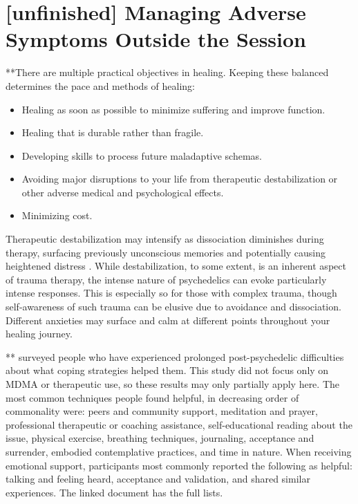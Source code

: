 \documentclass[12pt,letterpaper]{book}
\begin{document}
\section{[unfinished] Managing Adverse Symptoms Outside the Session}
\label{sectionManagement}
**There are multiple practical objectives in healing. Keeping these balanced determines the pace and methods of healing: 
\begin{itemize}
    \item Healing as soon as possible to minimize suffering and improve function.
    \item Healing that is durable rather than fragile.
    \item Developing skills to process future maladaptive schemas.
    \item Avoiding major disruptions to your life from therapeutic destabilization or other adverse medical and psychological effects.
    \item Minimizing cost.
\end{itemize}
Therapeutic destabilization may intensify as dissociation diminishes during therapy, surfacing previously unconscious memories and potentially causing heightened distress \cite{vanderKolkBody}. While destabilization, to some extent, is an inherent aspect of trauma therapy, the intense nature of psychedelics can evoke particularly intense responses. This is especially so for those with complex trauma, though self-awareness of such trauma can be elusive due to avoidance and dissociation. Different anxieties may surface and calm at different points throughout your healing journey.

**\textcite{robinson2024coming} surveyed people who have experienced prolonged post-psychedelic difficulties about what coping strategies helped them. This study did not focus only on MDMA or therapeutic use, so these results may only partially apply here. The most common techniques people found helpful, in decreasing order of commonality were: peers and community support, meditation and prayer, professional therapeutic or coaching assistance, self-educational reading about the issue, physical exercise, breathing techniques, journaling, acceptance and surrender, embodied contemplative practices, and time in nature. When receiving emotional support, participants most commonly reported the following as helpful: talking and feeling heard, acceptance and validation, and shared similar experiences. The linked document has the full lists.
\end{document}
